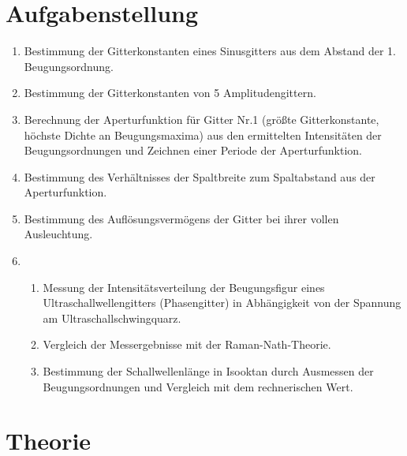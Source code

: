 \section{Aufgabenstellung}
\begin{enumerate}
 \item Bestimmung der Gitterkonstanten eines Sinusgitters aus dem Abstand der 1. Beugungsordnung.
\item Bestimmung der Gitterkonstanten von 5 Amplitudengittern.
\item Berechnung der Aperturfunktion für Gitter Nr.1 (größte Gitterkonstante,
      höchste Dichte an Beugungsmaxima) aus den ermittelten Intensitäten der
      Beugungsordnungen und Zeichnen einer Periode der Aperturfunktion.
\item Bestimmung des Verhältnisses der Spaltbreite zum Spaltabstand aus der
      Aperturfunktion.
\item Bestimmung des Auflösungsvermögens der Gitter bei ihrer vollen Ausleuchtung.
\item
  \begin{enumerate}
    \item Messung der Intensitätsverteilung der Beugungsfigur eines Ultraschallwellengitters (Phasengitter)
	in Abhängigkeit von der Spannung am Ultraschallschwingquarz.
    \item Vergleich der Messergebnisse mit der Raman-Nath-Theorie.
    \item Bestimmung der Schallwellenlänge in Isooktan durch Ausmessen der Beugungsordnungen und Vergleich mit dem rechnerischen Wert.
  \end{enumerate}
\end{enumerate}

\section{Theorie}
